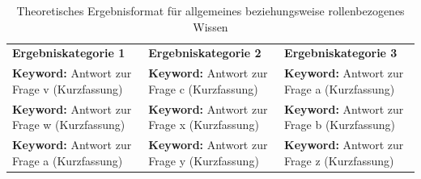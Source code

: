 \documentclass[
  10pt,
  ngerman,
  a4paper,
  toc=graduated,
  numbers=noenddot,
  headings=standardclasses,
  nonumberlist
]{scrartcl}
\begin{document}
\begin{table}[H]
\centering
\begin{tabularx}{\textwidth}{|Y|Y|Y|}
\hline
{}
 \\
\hline
{}
\textbf{Ergebniskategorie 1} 
& \textbf{Ergebniskategorie 2} 
& \textbf{Ergebniskategorie 3} \\
\hline

\textbf{Keyword:} \newline
Antwort zur Frage v \newline
(Kurzfassung)
&
\textbf{Keyword:} \newline
Antwort zur Frage c \newline
(Kurzfassung)
&
\textbf{Keyword:} \newline
Antwort zur Frage a \newline
(Kurzfassung) \\
\hline

\textbf{Keyword:} \newline
Antwort zur Frage w \newline
(Kurzfassung)
&
\textbf{Keyword:} \newline
Antwort zur Frage x \newline
(Kurzfassung)
&
\textbf{Keyword:} \newline
Antwort zur Frage b \newline
(Kurzfassung) \\
\hline

\textbf{Keyword:} \newline
Antwort zur Frage a \newline
(Kurzfassung)
&
\textbf{Keyword:} \newline
Antwort zur Frage y \newline
(Kurzfassung)
&
\textbf{Keyword:} \newline
Antwort zur Frage z \newline
(Kurzfassung) \\
\hline
\end{tabularx}
\caption{Theoretisches Ergebnisformat für allgemeines beziehungsweise rollenbezogenes Wissen}
\label{tab:ergebnisformat_allgemein}
\end{table}
\end{document}
